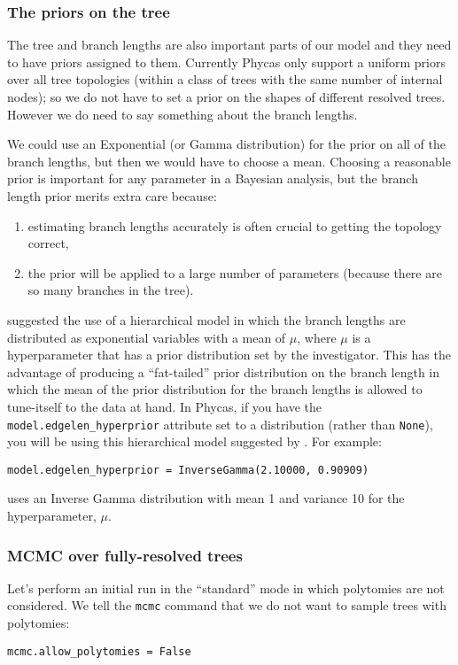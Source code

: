 \documentclass{article}
\newcommand{\cmd}[1]{\texttt{#1}\xspace}
\newcommand{\phycas}{Phycas\xspace}
\begin{document}
\subsubsection{The priors on the tree}
The tree and branch lengths are also important parts of our model and they need to have
priors assigned to them.
Currently \phycas only support a uniform priors over all tree topologies (within a
class of trees with the same number of internal nodes); so we do not have to set
a prior on the shapes of different resolved trees.
However we do need to say something about the branch lengths.

We could use an Exponential (or Gamma distribution) for the prior on all of the branch lengths, but then we would have to choose a mean.
Choosing a reasonable prior is important for any parameter in a Bayesian analysis, but 
the branch length prior merits extra care because:
\begin{enumerate}
	\item  estimating branch lengths accurately is often crucial to getting the topology correct,
	\item the prior will be applied to a large number of parameters (because there are so many branches in the tree).
\end{enumerate}
\citet{SuchardWS2001} suggested the use of a hierarchical model in which the branch lengths are distributed as exponential variables with a mean of $\mu$, where $\mu$ is a hyperparameter that 
has a prior distribution set by the investigator.
This has the advantage of producing a ``fat-tailed'' prior distribution on the branch length in which the 
mean of the prior distribution for the branch lengths is allowed to tune-itself to the data at hand.
In \phycas, if you have the \cmd{model.edgelen\_hyperprior} attribute set to a distribution (rather than \texttt{None}), you will be using this hierarchical model suggested by \citet{SuchardWS2001}.
For example:
\begin{verbatim}
model.edgelen_hyperprior = InverseGamma(2.10000, 0.90909)
\end{verbatim}
uses an Inverse Gamma distribution with mean 1 and variance 10 for the hyperparameter, $\mu$.

\subsubsection{MCMC over fully-resolved trees}
Let's perform an initial run in the ``standard'' mode in which polytomies are not considered.
We tell the \cmd{mcmc} command that we do not want to sample trees with polytomies:
\begin{verbatim}
mcmc.allow_polytomies = False
\end{verbatim}
\end{document}
